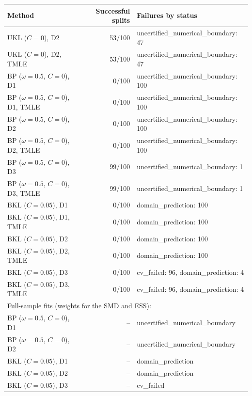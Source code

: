 \begin{tabular}{lrl}
\hline
Method & Successful splits & Failures by status \\
\hline
UKL ($C=0$), D2 & 53/100 & uncertified\_numerical\_boundary: 47 \\
UKL ($C=0$), D2, TMLE & 53/100 & uncertified\_numerical\_boundary: 47 \\
BP ($\omega=0.5$, $C=0$), D1 & 0/100 & uncertified\_numerical\_boundary: 100 \\
BP ($\omega=0.5$, $C=0$), D1, TMLE & 0/100 & uncertified\_numerical\_boundary: 100 \\
BP ($\omega=0.5$, $C=0$), D2 & 0/100 & uncertified\_numerical\_boundary: 100 \\
BP ($\omega=0.5$, $C=0$), D2, TMLE & 0/100 & uncertified\_numerical\_boundary: 100 \\
BP ($\omega=0.5$, $C=0$), D3 & 99/100 & uncertified\_numerical\_boundary: 1 \\
BP ($\omega=0.5$, $C=0$), D3, TMLE & 99/100 & uncertified\_numerical\_boundary: 1 \\
BKL ($C=0.05$), D1 & 0/100 & domain\_prediction: 100 \\
BKL ($C=0.05$), D1, TMLE & 0/100 & domain\_prediction: 100 \\
BKL ($C=0.05$), D2 & 0/100 & domain\_prediction: 100 \\
BKL ($C=0.05$), D2, TMLE & 0/100 & domain\_prediction: 100 \\
BKL ($C=0.05$), D3 & 0/100 & cv\_failed: 96, domain\_prediction: 4 \\
BKL ($C=0.05$), D3, TMLE & 0/100 & cv\_failed: 96, domain\_prediction: 4 \\
\hline
\multicolumn{3}{l}{Full-sample fits (weights for the SMD and ESS):} \\
BP ($\omega=0.5$, $C=0$), D1 & -- & uncertified\_numerical\_boundary \\
BP ($\omega=0.5$, $C=0$), D2 & -- & uncertified\_numerical\_boundary \\
BKL ($C=0.05$), D1 & -- & domain\_prediction \\
BKL ($C=0.05$), D2 & -- & domain\_prediction \\
BKL ($C=0.05$), D3 & -- & cv\_failed \\
\hline
\end{tabular}
